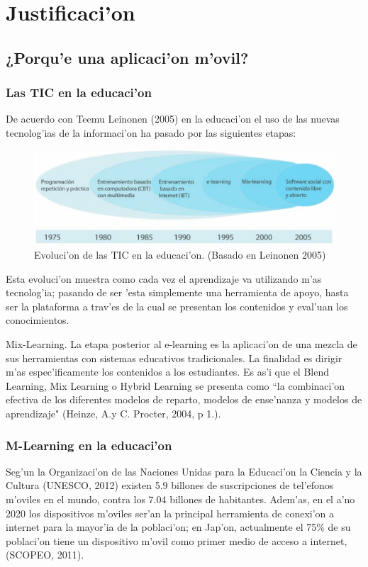 \chapter{Justificaci'on}
\section{¿Porqu'e una aplicaci'on m'ovil?}
\subsection{Las TIC en la educaci'on}
De acuerdo con Teemu Leinonen (2005) en la educaci'on el uso de las nuevas tecnolog'ias de la informaci'on ha pasado por las siguientes etapas:

\begin{figure}
	\begin{center}
		\includegraphics[scale=0.5]{img1.png} 
		\caption{Evoluci'on de las TIC en la educaci'on. (Basado en Leinonen 2005)}
		\label{tic}
	\end{center}
\end{figure}

Esta evoluci'on muestra como cada vez el aprendizaje va utilizando m'as tecnolog'ia; pasando de ser 'esta simplemente una herramienta de apoyo, hasta ser la plataforma a trav'es de la cual se presentan los contenidos y eval'uan los conocimientos. 

Mix-Learning. La etapa posterior al e-learning es la aplicaci'on de una mezcla de sus herramientas con sistemas educativos tradicionales. La finalidad es dirigir m'as espec'ificamente los contenidos a los estudiantes. Es as'i que el Blend Learning, Mix Learning o Hybrid Learning se presenta como ``la combinaci'on efectiva de los diferentes modelos de reparto, modelos de ense'nanza y modelos de aprendizaje" (Heinze, A.y C. Procter, 2004, p 1.).

\subsection{M-Learning en la educaci'on}
Seg'un la Organizaci'on de las Naciones Unidas para la Educaci'on la Ciencia y la Cultura (UNESCO, 2012) existen 5.9 billones de suscripciones de tel'efonos m'oviles en el mundo, contra los 7.04 billones de habitantes. Adem'as, en el a'no 2020 los dispositivos m'oviles ser'an la principal herramienta de conexi'on a internet para la mayor'ia de la poblaci'on; en Jap'on, actualmente el 75\% de su poblaci'on tiene un dispositivo m'ovil como primer medio de acceso a internet, (SCOPEO, 2011). 

